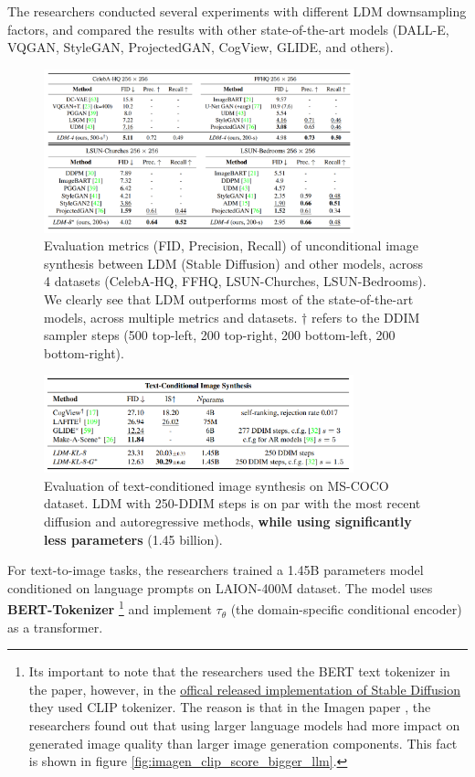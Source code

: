 The researchers conducted several experiments with different LDM downsampling factors, and compared the results with other state-of-the-art models (DALL-E, VQGAN, StyleGAN, ProjectedGAN, CogView, GLIDE, and others).

\begin{figure}
    \centering
    \includegraphics[width=0.8\textwidth]{images/diffusion_models/stable_diffusion/experiments_1.png}
    \caption{Evaluation metrics (FID, Precision, Recall) of unconditional image synthesis between LDM (Stable Diffusion) and other models, across 4 datasets (CelebA-HQ, FFHQ, LSUN-Churches, LSUN-Bedrooms). We clearly see that LDM outperforms most of the state-of-the-art models, across multiple metrics and datasets. $\dagger$ refers to the DDIM sampler steps (500 top-left, 200 top-right, 200 bottom-left, 200 bottom-right).}
\end{figure}

\begin{figure}
    \centering
    \includegraphics[width=0.8\textwidth]{images/diffusion_models/stable_diffusion/experiments_2.png}
    \caption{Evaluation of text-conditioned image synthesis on MS-COCO dataset. LDM with 250-DDIM steps is on par with the most recent diffusion and autoregressive methods, \textbf{while using significantly less parameters} (1.45 billion).}
\end{figure}

For text-to-image tasks, the researchers trained a 1.45B parameters model conditioned on language prompts on LAION-400M dataset. The model uses \textbf{BERT-Tokenizer} \footnote{Its important to note that the researchers used the BERT text tokenizer in the paper, however, in the \href{https://github.com/CompVis/latent-diffusion}{offical released implementation of Stable Diffusion} they used CLIP tokenizer. The reason is that in the Imagen paper \cite{imagen}, the researchers found out that using larger language models had more impact on generated image quality than larger image generation components. This fact is shown in figure \ref{fig:imagen_clip_score_bigger_llm}.} \cite{bert} and implement $\tau_\theta$ (the domain-specific conditional encoder) as a transformer.

